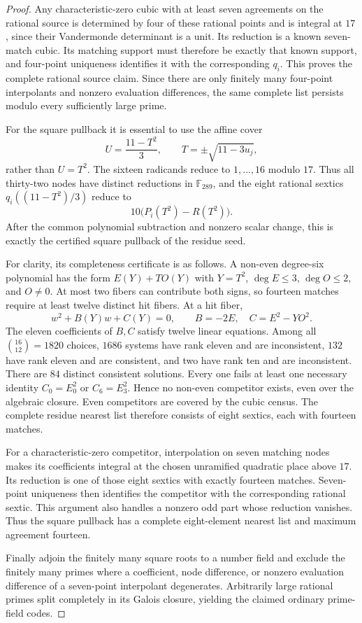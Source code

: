 \begin{proof}
Any characteristic-zero cubic with at least seven agreements on the rational source is determined by four of these rational points and is integral at $17$, since their Vandermonde determinant is a unit. Its reduction is a known seven-match cubic. Its matching support must therefore be exactly that known support, and four-point uniqueness identifies it with the corresponding $q_i$. This proves the complete rational source claim. Since there are only finitely many four-point interpolants and nonzero evaluation differences, the same complete list persists modulo every sufficiently large prime.

For the square pullback it is essential to use the affine cover
\[
 U=\frac{11-T^2}{3},\qquad
 T=\pm\sqrt{11-3u_j},
\]
rather than $U=T^2$. The sixteen radicands reduce to $1,\ldots,16$ modulo $17$. Thus all thirty-two nodes have distinct reductions in $\mathbb F_{289}$, and the eight rational sextics $q_i((11-T^2)/3)$ reduce to
\[
 10\bigl(P_i(T^2)-R(T^2)\bigr).
\]
After the common polynomial subtraction and nonzero scalar change, this is exactly the certified square pullback of the residue seed.

For clarity, its completeness certificate is as follows. A non-even degree-six polynomial has the form $E(Y)+T O(Y)$ with $Y=T^2$, $\deg E\le3$, $\deg O\le2$, and $O\ne0$. At most two fibers can contribute both signs, so fourteen matches require at least twelve distinct hit fibers. At a hit fiber,
\[
 w^2+B(Y)w+C(Y)=0,\qquad
 B=-2E,\quad C=E^2-YO^2.
\]
The eleven coefficients of $B,C$ satisfy twelve linear equations. Among all $\binom{16}{12}=1820$ choices, $1686$ systems have rank eleven and are inconsistent, $132$ have rank eleven and are consistent, and two have rank ten and are inconsistent. There are $84$ distinct consistent solutions. Every one fails at least one necessary identity $C_0=E_0^2$ or $C_6=E_3^2$. Hence no non-even competitor exists, even over the algebraic closure. Even competitors are covered by the cubic census. The complete residue nearest list therefore consists of eight sextics, each with fourteen matches.

For a characteristic-zero competitor, interpolation on seven matching nodes makes its coefficients integral at the chosen unramified quadratic place above $17$. Its reduction is one of those eight sextics with exactly fourteen matches. Seven-point uniqueness then identifies the competitor with the corresponding rational sextic. This argument also handles a nonzero odd part whose reduction vanishes. Thus the square pullback has a complete eight-element nearest list and maximum agreement fourteen.

Finally adjoin the finitely many square roots to a number field and exclude the finitely many primes where a coefficient, node difference, or nonzero evaluation difference of a seven-point interpolant degenerates. Arbitrarily large rational primes split completely in its Galois closure, yielding the claimed ordinary prime-field codes.
\end{proof}

